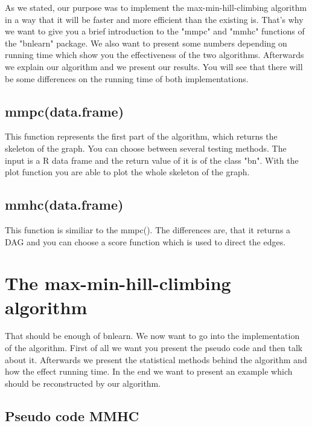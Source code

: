 	As we stated, our purpose was to implement the max-min-hill-climbing algorithm in a way that it will be faster and more efficient than the existing is. That's why we want to give you a brief introduction to the "mmpc" and "mmhc" functions of the "bnlearn" package. We also want to present some numbers depending on running time which show you the effectiveness of the two algorithms. Afterwards we explain our algorithm and we present our results. You will see that there will be some differences on the running time of both implementations.

	\section{mmpc(data.frame)}

		This function represents the first part of the algorithm, which returns the skeleton of the graph. You can choose between several testing methods. The input is a R data frame and the return value of it is of the class "bn". With the plot function you are able to plot the whole skeleton of the graph.

	\section{mmhc(data.frame)}

		This function is similiar to the mmpc(). The differences are, that it returns a DAG and you can choose a score function which is used to direct the edges.

\chapter{The max-min-hill-climbing algorithm}

	That should be enough of bnlearn. We now want to go into the implementation of the algorithm. First of all we want you present the pseudo code and then talk about it. Afterwards we present the statistical methods behind the algorithm and how the effect running time. In the end we want to present an example which should be reconstructed by our algorithm.

	\section{Pseudo code MMHC}

